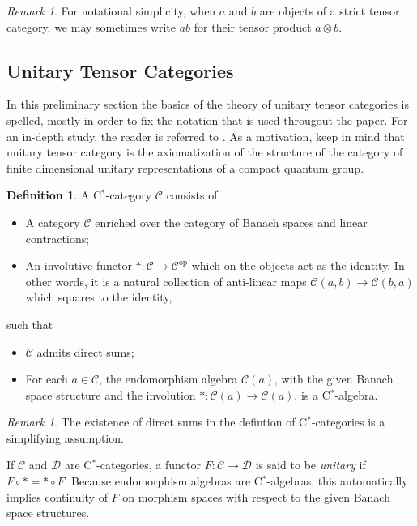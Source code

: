 \documentclass[a4paper,11pt,reqno]{amsart}
\numberwithin{equation}{section}
\theoremstyle{remark}
\newtheorem{remark}[theorem]{Remark}
\theoremstyle{definition}
\newtheorem{definition}[theorem]{Definition}
\newcommand{\cC}{\mathcal C}
\newcommand{\cD}{\mathcal D}
\newcommand\op{\text{op}}
\begin{document}
\begin{remark}
	For notational simplicity, when $a$ and $b$ are objects of a strict tensor category, we may sometimes write $ab$ for their tensor product $a \otimes b$.
\end{remark}

\subsection{Unitary Tensor Categories}
In this preliminary section the basics of the theory of unitary tensor categories is spelled, mostly in order to fix the notation that is used througout the paper. For an in-depth study, the reader is referred to \cite{MR3687214,MR3204665}.  As a motivation, keep in mind that unitary tensor category is the axiomatization of the structure of the category of finite dimensional unitary representations of a compact quantum group. 

\begin{definition}
	A C$^*$-category $\cC$ consists of
	\begin{itemize}
		\item  A category $\cC$ enriched over the category of Banach spaces and linear contractions;
		\item An involutive functor $* : \cC \to \cC^{\op}$ which on the objects act as the identity. In other words, it is a natural collection of anti-linear maps $\cC(a,b) \to \cC(b,a)$ which squares to the identity,
	\end{itemize}
	such that
	\begin{itemize}
		\item $\cC$ admits direct sums;
		\item For each $a \in \cC$, the endomorphism algebra $\cC(a)$, with the given Banach space structure and the involution $*: \cC(a) \to \cC(a)$, is a C$^*$-algebra.
	\end{itemize}
	\label{def:C*category}
\end{definition}

\begin{remark}
	The existence of direct sums in the defintion of C$^*$-categories is a simplifying assumption.
\end{remark}

If $\cC$ and $\cD$ are C$^*$-categories, a functor $F: \cC \to \cD$ is said to be {\em unitary} if $F \circ * = * \circ F$. Because endomorphism algebras are C$^*$-algebras, this automatically implies continuity of $F$ on morphism spaces with respect to the given Banach space structures.
\end{document}
